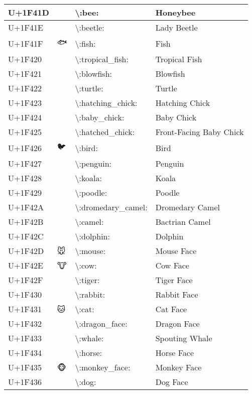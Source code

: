 \begin{table}[h]
\begin{tabulary}{\linewidth}{|L|L|L|L|}
\hline
U+1F41D & 🐝 & {\textbackslash}:bee: & Honeybee \\
\hline
U+1F41E & 🐞 & {\textbackslash}:beetle: & Lady Beetle \\
\hline
U+1F41F & 🐟 & {\textbackslash}:fish: & Fish \\
\hline
U+1F420 & 🐠 & {\textbackslash}:tropical\_fish: & Tropical Fish \\
\hline
U+1F421 & 🐡 & {\textbackslash}:blowfish: & Blowfish \\
\hline
U+1F422 & 🐢 & {\textbackslash}:turtle: & Turtle \\
\hline
U+1F423 & 🐣 & {\textbackslash}:hatching\_chick: & Hatching Chick \\
\hline
U+1F424 & 🐤 & {\textbackslash}:baby\_chick: & Baby Chick \\
\hline
U+1F425 & 🐥 & {\textbackslash}:hatched\_chick: & Front-Facing Baby Chick \\
\hline
U+1F426 & 🐦 & {\textbackslash}:bird: & Bird \\
\hline
U+1F427 & 🐧 & {\textbackslash}:penguin: & Penguin \\
\hline
U+1F428 & 🐨 & {\textbackslash}:koala: & Koala \\
\hline
U+1F429 & 🐩 & {\textbackslash}:poodle: & Poodle \\
\hline
U+1F42A & 🐪 & {\textbackslash}:dromedary\_camel: & Dromedary Camel \\
\hline
U+1F42B & 🐫 & {\textbackslash}:camel: & Bactrian Camel \\
\hline
U+1F42C & 🐬 & {\textbackslash}:dolphin: & Dolphin \\
\hline
U+1F42D & 🐭 & {\textbackslash}:mouse: & Mouse Face \\
\hline
U+1F42E & 🐮 & {\textbackslash}:cow: & Cow Face \\
\hline
U+1F42F & 🐯 & {\textbackslash}:tiger: & Tiger Face \\
\hline
U+1F430 & 🐰 & {\textbackslash}:rabbit: & Rabbit Face \\
\hline
U+1F431 & 🐱 & {\textbackslash}:cat: & Cat Face \\
\hline
U+1F432 & 🐲 & {\textbackslash}:dragon\_face: & Dragon Face \\
\hline
U+1F433 & 🐳 & {\textbackslash}:whale: & Spouting Whale \\
\hline
U+1F434 & 🐴 & {\textbackslash}:horse: & Horse Face \\
\hline
U+1F435 & 🐵 & {\textbackslash}:monkey\_face: & Monkey Face \\
\hline
U+1F436 & 🐶 & {\textbackslash}:dog: & Dog Face \\

\end{tabulary}
\end{table}
